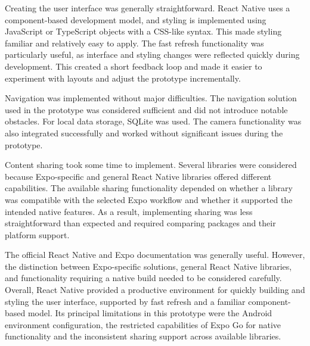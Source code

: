 Creating the user interface was generally straightforward.
React Native uses a component-based development model, and styling is implemented using JavaScript or TypeScript objects with a CSS-like syntax.
This made styling familiar and relatively easy to apply.
The fast refresh functionality was particularly useful, as interface and styling changes were reflected quickly during development.
This created a short feedback loop and made it easier to experiment with layouts and adjust the prototype incrementally.

Navigation was implemented without major difficulties.
The navigation solution used in the prototype was considered sufficient and did not introduce notable obstacles.
For local data storage, SQLite was used.
The camera functionality was also integrated successfully and worked without significant issues during the prototype.

Content sharing took some time to implement.
Several libraries were considered because Expo-specific and general React Native libraries offered different capabilities.
The available sharing functionality depended on whether a library was compatible with the selected Expo workflow and whether it supported the intended native features.
As a result, implementing sharing was less straightforward than expected and required comparing packages and their platform support.

The official React Native and Expo documentation was generally useful.
However, the distinction between Expo-specific solutions, general React Native libraries, and functionality requiring a native build needed to be considered carefully.
Overall, React Native provided a productive environment for quickly building and styling the user interface, supported by fast refresh and a familiar component-based model.
Its principal limitations in this prototype were the Android environment configuration, the restricted capabilities of Expo Go for native functionality and the inconsistent sharing support across available libraries.
